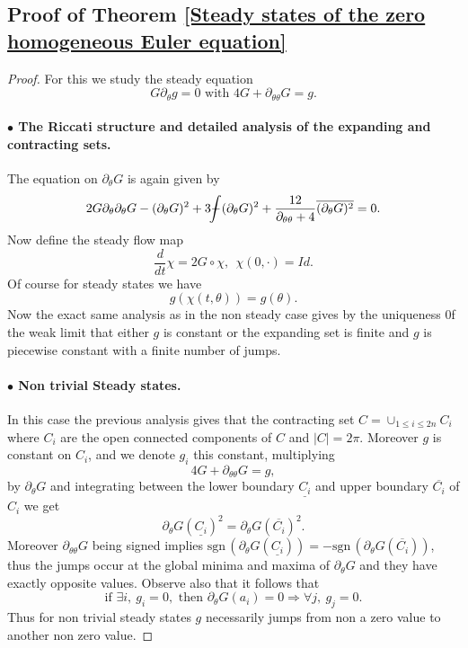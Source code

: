\documentclass[10pt]{article}
\numberwithin{equation}{section}
\theoremstyle{plain}
\theoremstyle{definition}
\newcommand{\prt}[1]{\left( #1 \right)}
\newcommand{\abs}[1]{\left| #1 \right|}
\newcommand{\sgn}{{\mbox{sgn}\,}}
\def\Xint#1{\mathchoice
{\XXint\displaystyle\textstyle{#1}}%
{\XXint\textstyle\scriptstyle{#1}}%
{\XXint\scriptstyle\scriptscriptstyle{#1}}%
{\XXint\scriptscriptstyle\scriptscriptstyle{#1}}%
\!\int}
\def\XXint#1#2#3{{\setbox0=\hbox{$#1{#2#3}{\int}$ }
\vcenter{\hbox{$#2#3$ }}\kern-.6\wd0}}
\def\dashint{\Xint-}
\numberwithin{equation}{section}
\begin{document}
\subsection{Proof of Theorem \ref{Steady states of the zero homogeneous Euler equation}}
\begin{proof}
For this we study the steady equation
\[
G\partial_\theta g=0 \text{ with } 4G+\partial_{\theta \theta}G=g.
\]
\paragraph{$\bullet$ The Riccati structure and detailed analysis of the expanding and contracting sets.} 
The equation on $\partial_\theta G$ is again given by
\[
  2G\partial_\theta \partial_\theta G-(\partial_\theta G)^2+3\dashint (\partial_\theta G)^2
+\frac{12}{\partial_{\theta \theta}+4} \overline{(\partial_\theta G)^2}=0.
\]
Now define the steady flow map
\[
\frac{d}{dt}\chi=2G\circ \chi, \ \  \chi(0,\cdot)=Id.
\]
Of course for steady states we have
\[
g(\chi(t,\theta))=g(\theta).
\]
Now the exact same analysis as in the non steady case gives by the uniqueness 0f the weak limit that either $g$ is constant or the expanding set is finite and $g$ is piecewise constant with a finite number of jumps. 
\paragraph{$\bullet$ Non trivial Steady states.}
In this case the previous analysis gives that the contracting set $C=\cup_{1\leq i\leq 2n}C_i$ where $C_i$ are the open connected components of $C$ and $\abs{C}=2\pi$. Moreover $g$ is constant on $C_i$, and we denote $g_i$ this constant, multiplying 
\[
4G+\partial_{\theta \theta}G=g,
\] 
by $\partial_\theta G$ and integrating between the lower boundary $\underline{C_i}$ and upper boundary $\overline{C_i}$ of $C_i$ we get
\[
\partial_\theta G(\underline{C_i})^2=\partial_\theta G(\overline{C_i})^2.
\]
Moreover $\partial_{\theta \theta}G$ being signed implies $\sgn \prt{\partial_\theta G(\underline{C_i})}=-\sgn \prt{\partial_\theta G(\overline{C_i})}$, thus the jumps occur at the global minima and maxima of $\partial_\theta G$ and they have exactly opposite values. Observe also that it follows that 
\begin{equation}\label{steady state balance}
\text{if } \exists i, \ g_i=0, \text{ then }\partial_\theta G(a_i)=0 \Longrightarrow \forall j, \ g_j=0. 
\end{equation}
Thus for non trivial steady states $g$ necessarily jumps from non a zero value to another non zero value.

\end{proof}
\end{document}
